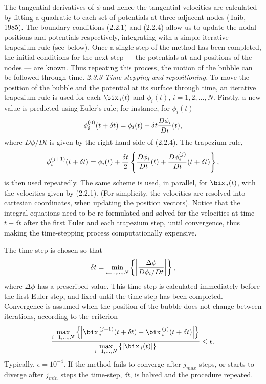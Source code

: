 The tangential derivatives of $\phi$ and hence the tangential velocities
are calculated by fitting a quadratic to each set of potentials at
three adjacent nodes (Taib, 1985).
The boundary conditions (2.2.1) and (2.2.4) allow us to update
the nodal positions and potentials respectively,
integrating with a simple iterative trapezium rule (see below).
Once a single step of the method has been completed, the initial
conditions for the next step --- the potentials at and positions of the nodes 
--- are known. Thus repeating this process, the motion of the bubble can be
followed through time.
\vskip 15pt
\c{\it 2.3.3 Time-stepping and repositioning.}
\nobreak
\vskip 5pt
To move the position of the bubble and the potential at its
surface through time, an iterative trapezium rule is used for
each $\bd{x}_i(t)$ and $\phi_i(t)$, $i=1,2,\ldots,N$.
Firstly, a new value is predicted using Euler's rule; for instance, for
$\phi_i(t)$
$$\phi_i^{(0)}(t+\delta t)=\phi_i (t)+\delta t {D\phi_i \over Dt}(t),$$
where ${D\phi/Dt}$ is given by
the right-hand side of (2.2.4).
The trapezium rule,
$$\phi_i^{(j+1)}(t+\delta t)=\phi_i (t)+
{\delta t\over 2}\left\{{D\phi_i \over Dt}(t)+
{D\phi_i^{(j)} \over Dt}(t+\delta t)\right\},$$
is then used repeatedly.
The same scheme is used, in parallel, for $\bd{x}_i (t)$, with
the velocities given by (2.2.1).
(For simplicity, the velocities are resolved into cartesian
coordinates, when updating the position vectors).
Notice that the integral equations need to be re-formulated and solved
for the velocities at time $t+\delta t$
after the first Euler and each trapezium step, until convergence, thus
making the time-stepping process computationally expensive.

The time-step is chosen so that
$$\delta t=\min_{i=1,\ldots,N}\left\{\left|{\Delta\phi\over{D\phi_i/Dt}}
\right|\right\},$$
where $\Delta\phi$ has a prescribed value. This time-step is calculated
immediately before the first Euler step, and fixed until the time-step
has been completed.
Convergence is assumed when the position of the bubble does not change
between iterations, according to the criterion
$${\max\limits_{i=1,\ldots,N}\left\{\left|\bd{x}_i^{(j+1)}(t+\delta t)-
\bd{x}_i^{(j)}(t+\delta t)\right|\right\}
\over \max\limits_{i=1,\ldots,N}\left\{\left|\bd{x}_i(t)\right|\right\}}
<\epsilon.$$
Typically, $\epsilon=10^{-4}$.
If the method fails to
converge after $j_{max}$ steps, or starts to diverge after $j_{min}$
steps the time-step, $\delta t$, is halved and the procedure repeated.

